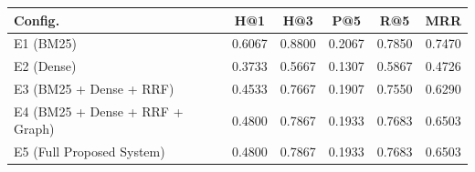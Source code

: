 \begin{tabular}{lccccc}
\hline
\textbf{Config.} & \textbf{H@1} & \textbf{H@3} & \textbf{P@5} & \textbf{R@5} & \textbf{MRR} \\
\hline
E1 (BM25)                          & 0.6067 & 0.8800 & 0.2067 & 0.7850 & 0.7470 \\
E2 (Dense)                         & 0.3733 & 0.5667 & 0.1307 & 0.5867 & 0.4726 \\
E3 (BM25 + Dense + RRF)            & 0.4533 & 0.7667 & 0.1907 & 0.7550 & 0.6290 \\
E4 (BM25 + Dense + RRF + Graph)    & 0.4800 & 0.7867 & 0.1933 & 0.7683 & 0.6503 \\
E5 (Full Proposed System)          & 0.4800 & 0.7867 & 0.1933 & 0.7683 & 0.6503 \\
\hline
\end{tabular}
